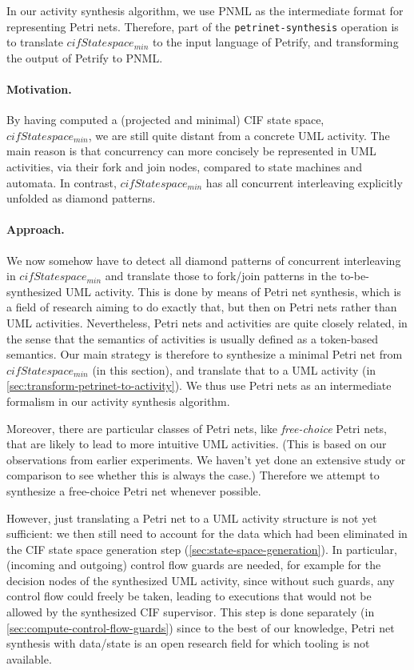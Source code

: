 \documentclass{article}
\newcommand{\keyw}[1]{\texttt{#1}}
\newcommand{\var}[1]{\ensuremath{\mathit{#1}}}
\newcommand{\petrinetSynthesisLabel}[0]{\keyw{petrinet-synthesis}}
\theoremstyle{definition}
\begin{document}
In our activity synthesis algorithm, we use PNML as the intermediate format for representing Petri nets.
Therefore, part of the \petrinetSynthesisLabel{} operation is to translate \var{cifStatespace_{min}} to the input language of Petrify, and transforming the output of Petrify to PNML.

\paragraph{Motivation.}
By having computed a (projected and minimal) CIF state space, \var{cifStatespace_{min}}, we are still quite distant from a concrete UML activity.
The main reason is that concurrency can more concisely be represented in UML activities, via their fork and join nodes, compared to state machines and automata.
In contrast, \var{cifStatespace_{min}} has all concurrent interleaving explicitly unfolded as diamond patterns.

\paragraph{Approach.}
We now somehow have to detect all diamond patterns of concurrent interleaving in \var{cifStatespace_{min}} and translate those to fork/join patterns in the to-be-synthesized UML activity.
This is done by means of Petri net synthesis, which is a field of research aiming to do exactly that, but then on Petri nets rather than UML activities.
Nevertheless, Petri nets and activities are quite closely related, in the sense that the semantics of activities is usually defined as a token-based semantics.
Our main strategy is therefore to synthesize a minimal Petri net from \var{cifStatespace_{min}} (in this section), and translate that to a UML activity (in \autoref{sec:transform-petrinet-to-activity}).
We thus use Petri nets as an intermediate formalism in our activity synthesis algorithm.

Moreover, there are particular classes of Petri nets, like \emph{free-choice} Petri nets, that are likely to lead to more intuitive UML activities.
(This is based on our observations from earlier experiments.
We haven't yet done an extensive study or comparison to see whether this is always the case.)
Therefore we attempt to synthesize a free-choice Petri net whenever possible.

However, just translating a Petri net to a UML activity structure is not yet sufficient: we then still need to account for the data which had been eliminated in the CIF state space generation step (\autoref{sec:state-space-generation}).
In particular, (incoming and outgoing) control flow guards are needed, for example for the decision nodes of the synthesized UML activity, since without such guards, any control flow could freely be taken, leading to executions that would not be allowed by the synthesized CIF supervisor.
This step is done separately (in \autoref{sec:compute-control-flow-guards}) since to the best of our knowledge, Petri net synthesis with data/state is an open research field for which tooling is not available.
\end{document}
